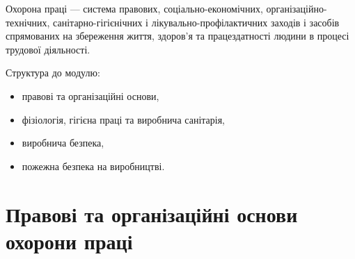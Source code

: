 \documentclass[a4paper,10pt,notitlepage,pdftex,headsepline]{scrartcl}
\begin{document}
  Охорона праці --- система правових, соціально-економічних,
  організаційно-технічних, санітарно-гігієнічних і лікувально-профілактичних
  заходів і засобів спрямованих на збереження життя, здоров’я та
  працездатності людини в процесі трудової діяльності.

  Структура до модулю:
  \begin{itemize}
    \item правові та організаційні основи,
    \item фізіологія, гігієна праці та виробнича санітарія,
    \item виробнича безпека,
    \item пожежна безпека на виробництві.
  \end{itemize}

\section{Правові та організаційні основи охорони праці}
\end{document}
